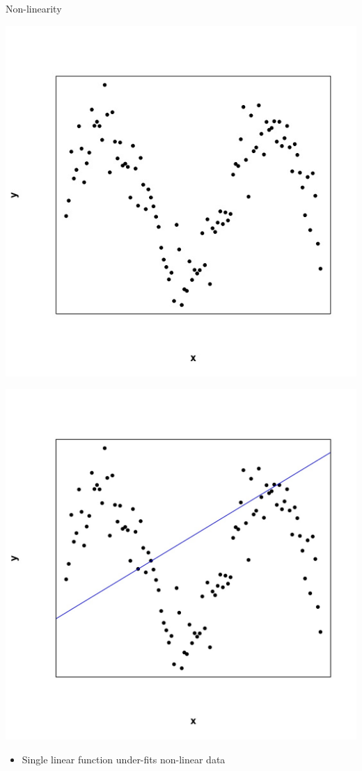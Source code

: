 \documentclass[english]{beamer}
\newcommand{\alertblue}[1]{{\color{blue}#1}}
\begin{document}
\begin{frame}{Non-linearity}
\begin{minipage}{0.49\textwidth}
        \centering
        \includegraphics[width=\linewidth]{images/nonlinear_data.jpeg} 
    \end{minipage}
    \hfill
    \begin{minipage}{0.49\textwidth}
        \centering
        \includegraphics[width=\linewidth]{images/nonlinear_fit.jpeg} 
    \end{minipage}
    \begin{itemize}
        \item Single linear function \alertblue{under-fits} non-linear data
    \end{itemize}
\end{frame}
\end{document}
